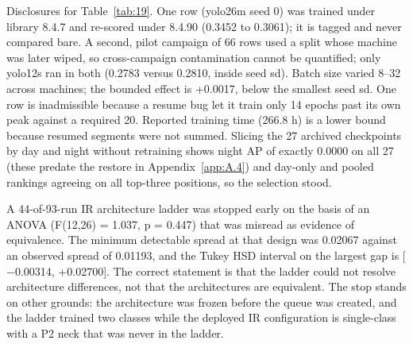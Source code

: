\documentclass[10pt]{article}
\begin{document}
Disclosures for Table~\ref{tab:19}. One row (yolo26m seed 0) was trained under library 8.4.7 and re-scored under 8.4.90 (0.3452 to 0.3061); it is tagged and never compared bare. A second, pilot campaign of 66 rows used a split whose machine was later wiped, so cross-campaign contamination cannot be quantified; only yolo12s ran in both (0.2783 versus 0.2810, inside seed sd). Batch size varied 8--32 across machines; the bounded effect is +0.0017, below the smallest seed sd. One row is inadmissible because a resume bug let it train only 14 epochs past its own peak against a required 20. Reported training time (266.8 h) is a lower bound because resumed segments were not summed. Slicing the 27 archived checkpoints by day and night without retraining shows night AP of exactly 0.0000 on all 27 (these predate the restore in Appendix~\ref{app:A.4}) and day-only and pooled rankings agreeing on all top-three positions, so the selection stood.

A 44-of-93-run IR architecture ladder was stopped early on the basis of an ANOVA (F(12,26) = 1.037, p = 0.447) that was misread as evidence of equivalence. The minimum detectable spread at that design was 0.02067 against an observed spread of 0.01193, and the Tukey HSD interval on the largest gap is [$-$0.00314, +0.02700]. The correct statement is that the ladder could not resolve architecture differences, not that the architectures are equivalent. The stop stands on other grounds: the architecture was frozen before the queue was created, and the ladder trained two classes while the deployed IR configuration is single-class with a P2 neck that was never in the ladder.

\FloatBarrier
\end{document}

